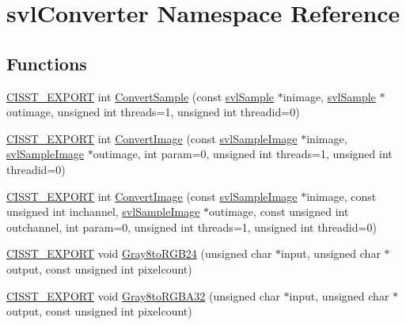 \hypertarget{namespacesvl_converter}{}\section{svl\+Converter Namespace Reference}
\label{namespacesvl_converter}
\subsection*{Functions}
\begin{DoxyCompactItemize}
\item 
\hyperlink{cmn_export_macros_8h_a99393e0c3ac434b2605235bbe20684f8}{C\+I\+S\+S\+T\+\_\+\+E\+X\+P\+O\+R\+T} int \hyperlink{namespacesvl_converter_a9f5ced81829331b45c476d7172e9a92b}{Convert\+Sample} (const \hyperlink{classsvl_sample}{svl\+Sample} $\ast$inimage, \hyperlink{classsvl_sample}{svl\+Sample} $\ast$outimage, unsigned int threads=1, unsigned int threadid=0)
\item 
\hyperlink{cmn_export_macros_8h_a99393e0c3ac434b2605235bbe20684f8}{C\+I\+S\+S\+T\+\_\+\+E\+X\+P\+O\+R\+T} int \hyperlink{namespacesvl_converter_a154cc93cbcea8a81917ba9018bcceae2}{Convert\+Image} (const \hyperlink{classsvl_sample_image}{svl\+Sample\+Image} $\ast$inimage, \hyperlink{classsvl_sample_image}{svl\+Sample\+Image} $\ast$outimage, int param=0, unsigned int threads=1, unsigned int threadid=0)
\item 
\hyperlink{cmn_export_macros_8h_a99393e0c3ac434b2605235bbe20684f8}{C\+I\+S\+S\+T\+\_\+\+E\+X\+P\+O\+R\+T} int \hyperlink{namespacesvl_converter_aea0e346b7e486f28816daeebc3d9c5cd}{Convert\+Image} (const \hyperlink{classsvl_sample_image}{svl\+Sample\+Image} $\ast$inimage, const unsigned int inchannel, \hyperlink{classsvl_sample_image}{svl\+Sample\+Image} $\ast$outimage, const unsigned int outchannel, int param=0, unsigned int threads=1, unsigned int threadid=0)
\item 
\hyperlink{cmn_export_macros_8h_a99393e0c3ac434b2605235bbe20684f8}{C\+I\+S\+S\+T\+\_\+\+E\+X\+P\+O\+R\+T} void \hyperlink{namespacesvl_converter_a7ae77af4245103cabc708474150364b4}{Gray8to\+R\+G\+B24} (unsigned char $\ast$input, unsigned char $\ast$output, const unsigned int pixelcount)
\item 
\hyperlink{cmn_export_macros_8h_a99393e0c3ac434b2605235bbe20684f8}{C\+I\+S\+S\+T\+\_\+\+E\+X\+P\+O\+R\+T} void \hyperlink{namespacesvl_converter_a7bd97b67111fd8ff6457031deec5306c}{Gray8to\+R\+G\+B\+A32} (unsigned char $\ast$input, unsigned char $\ast$output, const unsigned int pixelcount)

\end{DoxyCompactItemize}
